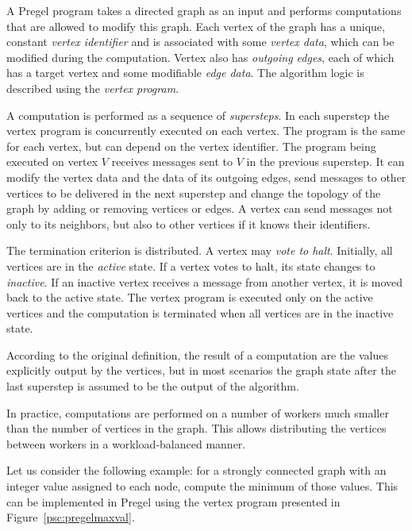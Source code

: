 A Pregel program takes a directed graph as an input and performs computations that are allowed to modify this graph.
Each vertex of the graph has a unique, constant \emph{vertex identifier} and is associated with some \emph{vertex data}, which can be modified during the computation. Vertex also has \emph{outgoing edges}, each of which has a target vertex and some modifiable \emph{edge data}. The algorithm logic is described using the \emph{vertex program}.

A computation is performed as a sequence of \emph{supersteps}. In each superstep the vertex program is concurrently executed on each vertex. The program is the same for each vertex, but can depend on the vertex identifier. The program being executed on vertex $V$ receives messages sent to $V$ in the previous superstep. It can modify the vertex data and the data of its outgoing edges, send messages to other vertices to be delivered in the next superstep and change the topology of the graph by adding or removing vertices or edges. A vertex can send messages not only to its neighbors, but also to other vertices if it knows their identifiers.

The termination criterion is distributed. A vertex may \emph{vote to halt}. Initially, all vertices are in the \emph{active} state. If a vertex votes to halt, its state changes to \emph{inactive}. If an inactive vertex receives a message from another vertex, it is moved back to the active state. The vertex program is executed only on the active vertices and the computation is terminated when all vertices are in the inactive state.

According to the original definition, the result of a computation are the values explicitly output by the vertices, but in most scenarios the graph state after the last superstep is assumed to be the output of the algorithm.

In practice, computations are performed on a number of workers much smaller than the number of vertices in the graph. This allows distributing the vertices between workers in a workload-balanced manner.

Let us consider the following example: for a strongly connected graph with an integer value assigned to each node, compute the minimum of those values. This can be implemented in Pregel using the vertex program presented in Figure~\ref{psc:pregelmaxval}.


